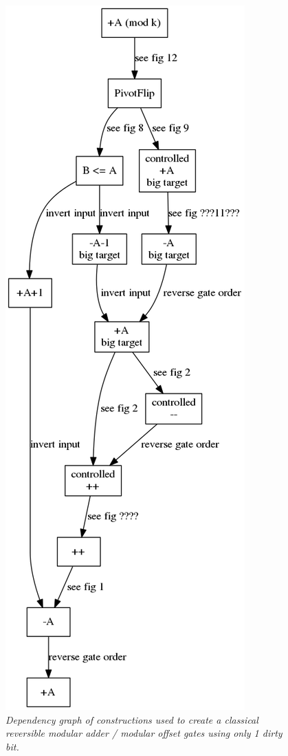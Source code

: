 \documentclass[twocolumn]{article}
\begin{document}
\begin{figure}
  \centering
  \includegraphics[totalheight=18cm]{modular-add-graph.png}
  \caption{\em
      Dependency graph of constructions used to create a classical reversible modular adder / modular offset gates using only 1 dirty bit.}
  \label{fig:modular-dependencies}
\end{figure}
\end{document}
